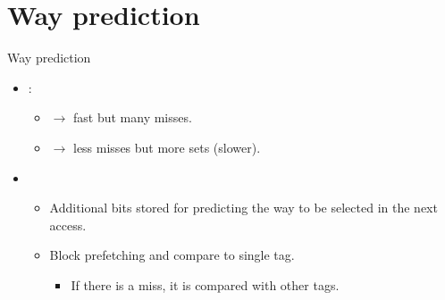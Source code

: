 \section{Way prediction}

\begin{frame}[t]{Way prediction}
\begin{itemize}
  \item {}:
    \begin{itemize}
      \item {} $\rightarrow$ fast but many misses.
      \item {} $\rightarrow$ less misses but more sets (slower).
    \end{itemize}

  \item {}
    \begin{itemize}
      \item Additional bits stored for predicting the way to be selected in the next access.
      \item Block prefetching and compare to single tag.
        \begin{itemize}
          \item If there is a miss, it is compared with other tags.
        \end{itemize}
    \end{itemize}
\end{itemize}
\end{frame}
